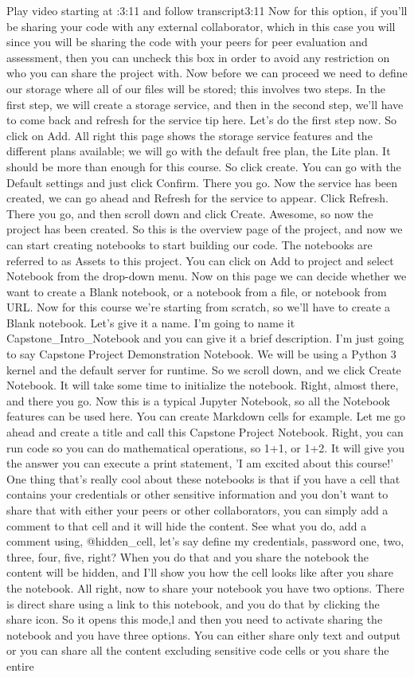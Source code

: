	Play video starting at :3:11 and follow transcript3:11
	Now for this option, if you'll be sharing your code with any external collaborator, which in this case you will since you will be sharing the code with your peers for peer evaluation and assessment, then you can uncheck this box in order to avoid any restriction on who you can share the project with. Now before we can proceed we need to define our storage where all of our files will be stored; this involves two steps. In the first step, we will create a storage service, and then in the second step, we'll have to come back and refresh for the service tip here. Let's do the first step now. So click on Add. All right this page shows the storage service features and the different plans available; we will go with the default free plan, the Lite plan. It should be more than enough for this course. So click create. You can go with the Default settings and just click Confirm. There you go. Now the service has been created, we can go ahead and Refresh for the service to appear. Click Refresh. There you go, and then scroll down and click Create. Awesome, so now the project has been created. So this is the overview page of the project, and now we can start creating notebooks to start building our code. The notebooks are referred to as Assets to this project. You can click on Add to project and select Notebook from the drop-down menu. Now on this page we can decide whether we want to create a Blank notebook, or a notebook from a file, or notebook from URL. Now for this course we're starting from scratch, so we'll have to create a Blank notebook. Let's give it a name. I'm going to name it Capstone_Intro_Notebook and you can give it a brief description. I'm just going to say Capstone Project Demonstration Notebook. We will be using a Python 3 kernel and the default server for runtime. So we scroll down, and we click Create Notebook. It will take some time to initialize the notebook. Right, almost there, and there you go. Now this is a typical Jupyter Notebook, so all the Notebook features can be used here. You can create Markdown cells for example. Let me go ahead and create a title and call this Capstone Project Notebook. Right, you can run code so you can do mathematical operations, so 1+1, or 1+2. It will give you the answer you can execute a print statement, 'I am excited about this course!' One thing that's really cool about these notebooks is that if you have a cell that contains your credentials or other sensitive information and you don't want to share that with either your peers or other collaborators, you can simply add a comment to that cell and it will hide the content. See what you do, add a comment using, @hidden_cell, let's say define my credentials, password one, two, three, four, five, right? When you do that and you share the notebook the content will be hidden, and I'll show you how the cell looks like after you share the notebook. All right, now to share your notebook you have two options. There is direct share using a link to this notebook, and you do that by clicking the share icon. So it opens this mode,l and then you need to activate sharing the notebook and you have three options. You can either share only text and output or you can share all the content excluding sensitive code cells or you share the entire 
